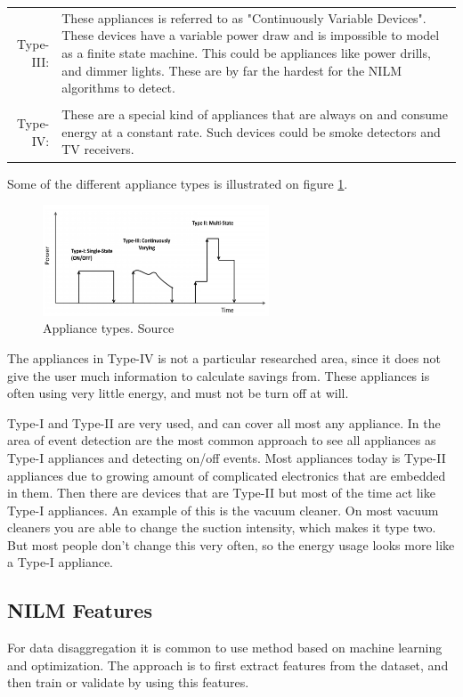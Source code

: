 \begin{tabularx}{\linewidth}{ r X }
Type-III:&These appliances is referred to as "Continuously Variable
Devices". These devices have a variable power draw and is impossible to model as a finite state machine. This could be appliances like power drills, and dimmer lights. These are by far the hardest for the NILM algorithms to detect. \\
\\
Type-IV:& These are a special kind of appliances that are always on and consume energy at a constant rate. Such devices could be smoke detectors and TV receivers.  \\
\end{tabularx}

Some of the different appliance types is illustrated on figure \ref{fig:ATO}. 


\begin{figure}[H]
\centering
\includegraphics[width=0.6\textwidth]{billeder/Types.png}
\caption{Appliance types. Source \citep{RefWorks:17}}
\label{fig:ATO}
\end{figure}

The appliances in Type-IV is not a particular researched area, since it does not give the user much information to calculate savings from. These appliances is often using very little energy, and must not be turn off at will. 

Type-I and Type-II are very used, and can cover all most any appliance. In the area of event detection are the most common approach to see all appliances as Type-I appliances and detecting on/off events. Most appliances today is Type-II appliances due to growing amount of complicated electronics that are embedded in them. Then there are devices that are Type-II but most of the time act like Type-I appliances. An example of this is the vacuum cleaner. On most vacuum cleaners you are able to change the suction intensity, which makes it type two. But most people don't change this very often, so the energy usage looks more like a Type-I appliance. 
 
\subsection{NILM Features} 
For data disaggregation it is common to use method based on machine learning and optimization. The approach is to first extract features from the dataset, and then train or validate by using this features. 

